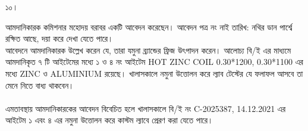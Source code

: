 \documentclass[12pt]{article}
\newcommand{\beno}{C-2025387}
\newcommand{\bedt}{14.12.2021}
\begin{document}
\thispagestyle{empty}
\vspace*{7.0in}
\noindent
\begin{minipage}[t]{0.05\linewidth}
১০।
\end{minipage}
\begin{minipage}[t]{0.95\linewidth}
আমদানিকারক কমিশনার মহোদয় বরাবর
একটি আবেদন করেছেন। আবেদন পত্র নং নাই তারিখ:
নথির ডান পার্শ্বে রক্ষিত আছে, দয়া করে দেখা যেতে পারে।
\\
আবেদনে আমদানিকারক উল্লেখ করেন যে, তারা যমুনা
ব্র্যান্ডের ফ্রিজ উৎপাদন করেন। আলোচ্য বি/ই এর মাধ্যমে
আমদানিকৃত ৭ টি আইটেমের মধ্যে ১ ও ৪ নং আইটেম
HOT ZINC COIL 0.30*1200, 0.30*1100
এর মধ্যে
ZINC ও ALUMINIUM
রয়েছে।
খালাসকালে নমুনা উত্তোলন করে
ল্যাব টেস্টের যে ফলাফল আসবে
তা মেনে নিতে বাধ্য থাকবেন।
\\
\\
এমতাবস্থায় আমদানিকারকের
আবেদন বিবেচিত হলে খালাসকালে
বি/ই নং {\beno}, {\bedt}
এর আইটেম ১ এবং ৪ এর
নমুনা উত্তোলন করে
কাস্টম ল্যাবে প্রেরণ করা যেতে পারে।
\end{minipage}
\end{document}
